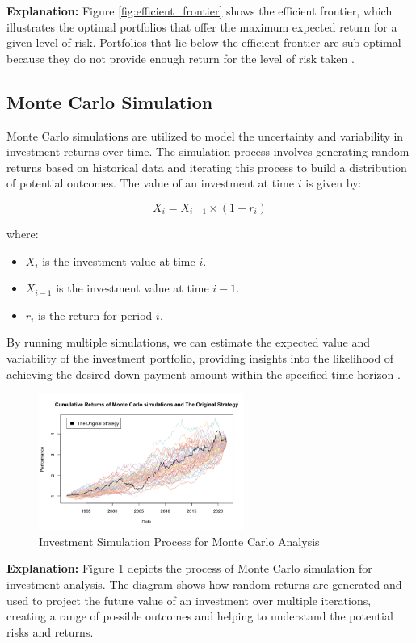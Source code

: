 \textbf{Explanation:} Figure \ref{fig:efficient_frontier} shows the efficient frontier, which illustrates the optimal portfolios that offer the maximum expected return for a given level of risk. Portfolios that lie below the efficient frontier are sub-optimal because they do not provide enough return for the level of risk taken \citep{markowitz1952portfolio}.

\subsection{Monte Carlo Simulation}
Monte Carlo simulations are utilized to model the uncertainty and variability in investment returns over time. The simulation process involves generating random returns based on historical data and iterating this process to build a distribution of potential outcomes. The value of an investment at time $i$ is given by:

\begin{equation}
X_i = X_{i-1} \times (1 + r_i)
\end{equation}

where:
\begin{itemize}
    \item $X_i$ is the investment value at time $i$.
    \item $X_{i-1}$ is the investment value at time $i-1$.
    \item $r_i$ is the return for period $i$.
\end{itemize}

By running multiple simulations, we can estimate the expected value and variability of the investment portfolio, providing insights into the likelihood of achieving the desired down payment amount within the specified time horizon \citep{glasserman2004monte}.

\begin{figure}[h!]
    \centering
    \includegraphics[width=0.6\textwidth]{../Figures/investment_simulation_process.png}
    \caption{Investment Simulation Process for Monte Carlo Analysis}
    \label{fig:investment_simulation}
\end{figure}

\textbf{Explanation:} Figure \ref{fig:investment_simulation} depicts the process of Monte Carlo simulation for investment analysis. The diagram shows how random returns are generated and used to project the future value of an investment over multiple iterations, creating a range of possible outcomes and helping to understand the potential risks and returns.

\newpage
